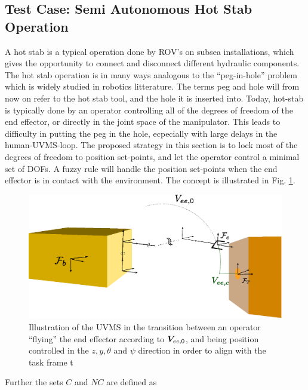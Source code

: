 \subsection{Test Case: Semi Autonomous Hot Stab Operation}
A hot stab is a typical operation done by ROV's on subsea installations, which gives the opportunity to connect and disconnect different hydraulic components. 
The hot stab operation is in many ways analogous to the ``peg-in-hole'' problem which is widely studied in robotics litterature. The terms peg and hole will from now on refer to the hot stab tool, and the hole it is inserted into. 
Today, hot-stab is typically done by an operator controlling all of the degrees of freedom of the end effector, or directly in the joint space of the manipulator. This leads to difficulty in putting the peg in the hole, ecpecially 
with large delays in the human-UVMS-loop. 
The proposed strategy in this section is to lock most of the degrees of freedom to position set-points, and let the operator control a minimal set of DOFs. A fuzzy rule will handle the position set-points when the end effector is in 
contact with the environment. The concept is illustrated in Fig. \ref{fig:hot_stab2}.


\begin{figure}[h!]
	\centering
	\includegraphics[scale=0.7]{./figures/uvms_hot_stab2.eps}
	\caption{Illustration of the UVMS in the transition between an operator ``flying'' the end effector according to $\boldsymbol V_{ee,0}$, and being position controlled in the $z,y,\theta $ and $ \psi$ direction in order to align with the task frame \frame t}
	\label{fig:hot_stab2}
\end{figure}
Further the sets $C$ and $NC$ are defined as

